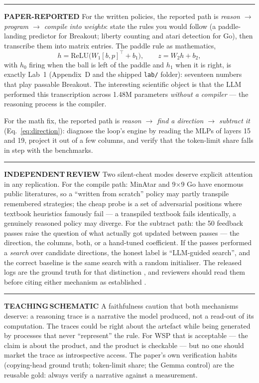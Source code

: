 \documentclass[11pt,a4paper]{article}
\newcommand{\bP}{\textcolor{wspblue}{\rule[0.12ex]{1.5mm}{1.5mm}}\;\textcolor{wspblue}{\textbf{PAPER-REPORTED}}}
\newcommand{\bR}{\textcolor{wspgreen}{\rule[0.12ex]{1.5mm}{1.5mm}}\;\textcolor{wspgreen}{\textbf{INDEPENDENT\,REVIEW}}}
\newcommand{\bS}{\textcolor{wspamber}{\rule[0.12ex]{1.5mm}{1.5mm}}\;\textcolor{wspamber}{\textbf{TEACHING\,SCHEMATIC}}}
\begin{document}
\bP\; For the written policies, the reported path is \emph{reason $\to$ program $\to$ compile into weights}: state the rules you would follow (a paddle-landing predictor for Breakout; liberty counting and atari detection for Go), then transcribe them into matrix entries. The paddle rule as mathematics,
\begin{equation}\label{eq:compile}
h = \mathrm{ReLU}\bigl(W_1 [b, p]^{\top} + b_1\bigr), \qquad z = W_2 h + b_2,
\end{equation}
with $h_0$ firing when the ball is left of the paddle and $h_1$ when it is right, is exactly Lab~1 (Appendix~D and the shipped \texttt{lab/} folder): seventeen numbers that play passable Breakout. The interesting scientific object is that the LLM performed this transcription across 1.48M parameters \emph{without a compiler} --- the reasoning process is the compiler.

For the math fix, the reported path is \emph{reason $\to$ find a direction $\to$ subtract it} (Eq.~\ref{eq:direction}): diagnose the loop's engine by reading the MLPs of layers 15 and 19, project it out of a few columns, and verify that the token-limit share falls in step with the benchmarks.

\bR\; Two silent-cheat modes deserve explicit attention in any replication. For the compile path: MinAtar and 9$\times$9 Go have enormous public literatures, so a ``written from scratch'' policy may partly transpile remembered strategies; the cheap probe is a set of adversarial positions where textbook heuristics famously fail --- a transpiled textbook fails identically, a genuinely reasoned policy may diverge. For the subtract path: the 50 feedback passes raise the question of what actually got updated between passes --- the direction, the columns, both, or a hand-tuned coefficient. If the passes performed a \emph{search} over candidate directions, the honest label is ``LLM-guided search'', and the correct baseline is the same search with a random initialiser. The released logs are the ground truth for that distinction \cite{wsp-logs}, and reviewers should read them before citing either mechanism as established \cite{maier}.

\bS\; A faithfulness caution that both mechanisms deserve: a reasoning trace is a narrative the model produced, not a read-out of its computation. The traces could be right about the artefact while being generated by processes that never ``represent'' the rule. For WSP that is acceptable --- the claim is about the product, and the product is checkable --- but no one should market the trace as introspective access. The paper's own verification habits (copying-head ground truth; token-limit share; the Gemma control) are the reusable gold: always verify a narrative against a measurement.
\end{document}
